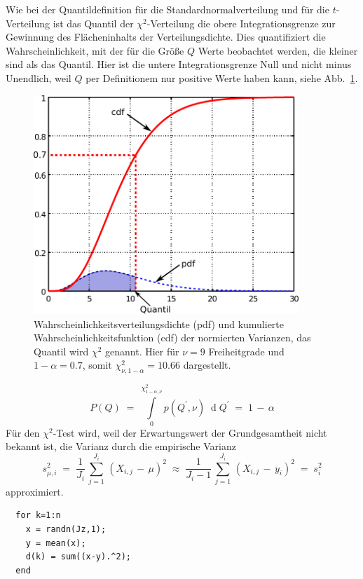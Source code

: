 Wie bei der Quantildefinition für die Standardnormalverteilung und für die $t$-Verteilung
ist das Quantil der $\chi^2$-Verteilung die obere Integrationsgrenze
zur Gewinnung des Flächeninhalts der Verteilungsdichte. Dies quantifiziert die Wahrscheinlichkeit,
mit der für die Größe $Q$ Werte beobachtet werden, die kleiner sind als das Quantil.
Hier ist die untere Integrationsgrenze Null und nicht minus Unendlich, weil $Q$ per
Definitionem nur positive Werte haben kann, siehe Abb.~\ref{chi2quantil}.
\begin{figure}
\begin{center}
\includegraphics[width=100mm]{05_vorlesung/media/chiquadrat.pdf}
\caption{\label{chi2quantil}Wahrscheinlichkeitsverteilungsdichte (pdf) und
kumulierte Wahrscheinlichkeitsfunktion (cdf)
der normierten Varianzen, das Quantil wird $\chi^2$ genannt. Hier für 
$\nu = 9$ Freiheitgrade und $1 - \alpha = 0.7$, somit $\chi^2_{\nu, 1-\alpha} = 10.66$
dargestellt.}
\end{center}
\end{figure}
\begin{equation}
P(Q) \; = \; 
\int \limits_0^{\chi^2_{1-\alpha, \nu}}
p(Q^\prime, \nu) \; \operatorname{d} Q^\prime \; = \;
1 \, - \, \alpha
\label{chiQuadratQuantil}
\end{equation}
Für den $\chi^2$-Test wird, weil der Erwartungswert der Grundgesamtheit nicht bekannt ist,
die Varianz durch die empirische Varianz 
\begin{equation}
s_{\mu,i}^2 \; = \; \frac{1}{J_i} \, \sum_{j=1}^{J_i} \, (X_{i,j} \, - \, \mu)^2
\; \approx \; \frac{1}{J_i-1} \, \sum_{j=1}^{J_i} \, (X_{i,j} \, - \, y_i)^2
\; = \; s_i^2
\end{equation}
approximiert.
\begin{lstlisting}
  for k=1:n
    x = randn(Jz,1);
    y = mean(x);
    d(k) = sum((x-y).^2);
  end
\end{lstlisting}

